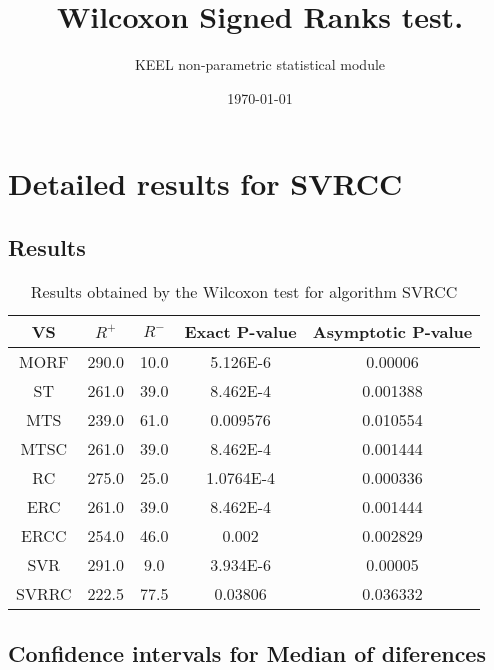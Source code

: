 \documentclass[a4paper,10pt]{article}
\title{Wilcoxon Signed Ranks test.}
\date{\today}
\author{KEEL non-parametric statistical module}
\begin{document}
\pagestyle{empty}
\maketitle
\thispagestyle{empty}



\section{Detailed results for SVRCC}


\subsection{Results}

\begin{table}[!htp]
\centering\small
\begin{tabular}{
|c|c|c|c|c|}
\hline
 VS & $R^{+}$ & $R^{-}$ & Exact P-value & Asymptotic P-value \\ \hline 
MORF & 290.0 & 10.0 & 5.126E-6 & 0.00006\\ \hline 
ST & 261.0 & 39.0 & 8.462E-4 & 0.001388\\ \hline 
MTS & 239.0 & 61.0 & 0.009576 & 0.010554\\ \hline 
MTSC & 261.0 & 39.0 & 8.462E-4 & 0.001444\\ \hline 
RC & 275.0 & 25.0 & 1.0764E-4 & 0.000336\\ \hline 
ERC & 261.0 & 39.0 & 8.462E-4 & 0.001444\\ \hline 
ERCC & 254.0 & 46.0 & 0.002 & 0.002829\\ \hline 
SVR & 291.0 & 9.0 & 3.934E-6 & 0.00005\\ \hline 
SVRRC & 222.5 & 77.5 & 0.03806 & 0.036332\\ \hline 

\end{tabular}
\caption{Results obtained by the Wilcoxon test for algorithm SVRCC}
\end{table}

\subsection{Confidence intervals for Median of diferences}
\end{document}
